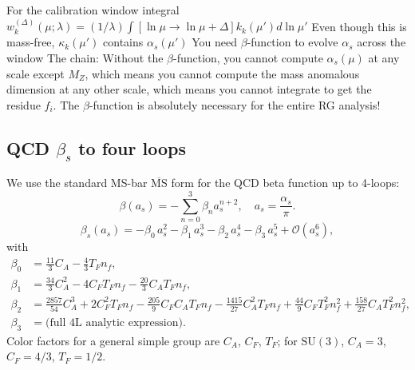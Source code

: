 \documentclass[aps,prd,onecolumn,amsmath,amssymb,superscriptaddress,nofootinbib,showpacs,showkeys]{revtex4-2}
\begin{document}
For the calibration window integral 
$   w_k^(\Delta)(\mu ; \lambda) = (1/\lambda) \int [\ln \mu \to \ln \mu + \Delta] k_k(\mu') d \ln \mu'$
Even though this is mass-free, $\kappa_k(\mu')$ contains $\alpha_s(\mu')$
You need $\beta$-function to evolve $\alpha_s$ across the window
The chain:
Without the $\beta$-function, you cannot compute $\alpha_s(\mu)$ at any scale except $M_Z$,
which means you cannot compute the mass anomalous dimension at any other scale, which means you cannot integrate to get the residue $f_i$.
The $\beta$-function is absolutely necessary for the entire RG analysis!













\subsection{ QCD \texorpdfstring{$\beta_s$}{beta\_s} to four loops}
We use the standard MS-bar  $\overline{\mathrm{MS}}$ form for the  QCD beta function up to 4-loops:
\begin{equation}
\beta(a_s) = - \sum_{n=0}^{3} \beta_n a_s^{n+2}, \quad a_s = \frac{\alpha_s}{\pi}.
\end{equation}
\[
\beta_s(a_s)= -\beta_0\,a_s^2 - \beta_1\,a_s^3 - \beta_2\,a_s^4 - \beta_3\,a_s^5 + \mathcal{O}(a_s^6),
\]
with
\begin{align*}
\beta_0 &= \frac{11}{3}C_A - \frac{4}{3}T_F n_f,\\[2pt]
\beta_1 &= \frac{34}{3}C_A^2 - 4 C_F T_F n_f - \frac{20}{3} C_A T_F n_f,\\[2pt]
\beta_2 &= \frac{2857}{54}C_A^3 + 2 C_F^2 T_F n_f - \frac{205}{9} C_F C_A T_F n_f - \frac{1415}{27} C_A^2 T_F n_f
+ \frac{44}{9} C_F T_F^2 n_f^2 + \frac{158}{27} C_A T_F^2 n_f^2,\\[2pt]
\beta_3 &= \text{(full 4L analytic expression)}.
\end{align*}
Color factors for a general simple group are $C_A$, $C_F$, $T_F$; for $\mathrm{SU}(3)$, $C_A=3$, $C_F=4/3$, $T_F=1/2$.
\end{document}
